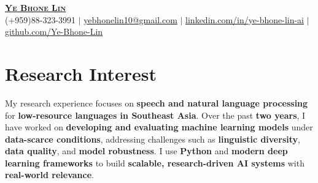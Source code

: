 \documentclass[letterpaper,11pt]{article}
\begin{document}

\begin{center}
    \textbf{\Huge \scshape \href{https://scholar.google.com/citations?hl=en&authuser=1&user=QwOP-38AAAAJ}{Ye Bhone Lin} }\\ \vspace{1pt}
    \small (+959)88-323-3991 $|$ \href{mailto:yebhonelin10@gmail.com}{\underline{yebhonelin10@gmail.com}} $|$ 
    \href{https://www.linkedin.com/in/ye-bhone-lin-ai/}{\underline{linkedin.com/in/ye-bhone-lin-ai}} $|$
    \href{https://github.com/Ye-Bhone-Lin}{\underline{github.com/Ye-Bhone-Lin}} 
\end{center}



\section{Research Interest}
My research experience focuses on \textbf{speech and natural language processing} for \textbf{low-resource languages in Southeast Asia}. Over the past \textbf{two years}, I have worked on \textbf{developing and evaluating machine learning models} under \textbf{data-scarce conditions}, addressing challenges such as \textbf{linguistic diversity}, \textbf{data quality}, and \textbf{model robustness}. I use \textbf{Python} and \textbf{modern deep learning frameworks} to build \textbf{scalable, research-driven AI systems} with \textbf{real-world relevance}.


\end{document}
